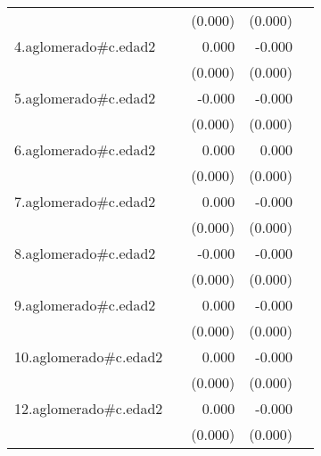{\begin{longtable}{l*{4}{D{.}{.}{-1}}}
            &                     &     (0.000)         &     (0.000)         &                     \\
\addlinespace
4.aglomerado#c.edad2&                     &       0.000         &      -0.000\sym{**} &                     \\
            &                     &     (0.000)         &     (0.000)         &                     \\
\addlinespace
5.aglomerado#c.edad2&                     &      -0.000         &      -0.000\sym{*}  &                     \\
            &                     &     (0.000)         &     (0.000)         &                     \\
\addlinespace
6.aglomerado#c.edad2&                     &       0.000\sym{*}  &       0.000         &                     \\
            &                     &     (0.000)         &     (0.000)         &                     \\
\addlinespace
7.aglomerado#c.edad2&                     &       0.000         &      -0.000         &                     \\
            &                     &     (0.000)         &     (0.000)         &                     \\
\addlinespace
8.aglomerado#c.edad2&                     &      -0.000         &      -0.000\sym{**} &                     \\
            &                     &     (0.000)         &     (0.000)         &                     \\
\addlinespace
9.aglomerado#c.edad2&                     &       0.000         &      -0.000\sym{*}  &                     \\
            &                     &     (0.000)         &     (0.000)         &                     \\
\addlinespace
10.aglomerado#c.edad2&                     &       0.000         &      -0.000\sym{*}  &                     \\
            &                     &     (0.000)         &     (0.000)         &                     \\
\addlinespace
12.aglomerado#c.edad2&                     &       0.000         &      -0.000         &                     \\
            &                     &     (0.000)         &     (0.000)         &                     \\

\end{longtable}}
